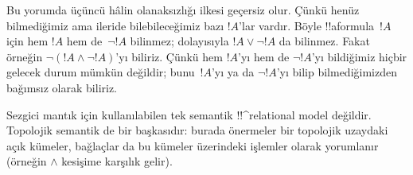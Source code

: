 \documentclass[../../../include/open-logic-section]{subfiles}
\begin{document}
Bu yorumda üçüncü hâlin olanaksızlığı ilkesi geçersiz olur. Çünkü henüz
bilmediğimiz ama ileride bilebileceğimiz bazı $!A$'lar vardır. Böyle
!!a{formula}~$!A$ için hem $!A$ hem de~$\lnot !A$ bilinmez; dolayısıyla $!A
\lor \lnot !A$ da bilinmez. Fakat örneğin $\lnot(!A \land \lnot !A)$'yı
biliriz. Çünkü hem $!A$'yı hem de $\lnot !A$'yı bildiğimiz hiçbir gelecek durum
mümkün değildir; bunu~$!A$'yı ya da $\lnot !A$'yı bilip bilmediğimizden
bağımsız olarak biliriz.

Sezgici mantık için kullanılabilen tek semantik !!^{relational model}
değildir. Topolojik semantik de bir başkasıdır: burada önermeler bir topolojik
uzaydaki açık kümeler, bağlaçlar da bu kümeler üzerindeki işlemler olarak
yorumlanır (örneğin $\land$ kesişime karşılık gelir).
\end{document}
